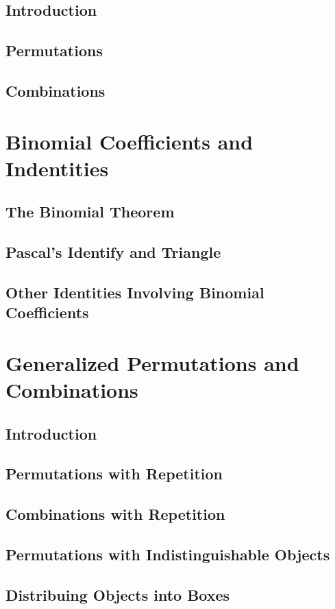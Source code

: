 \documentclass[11pt]{book}
\begin{document}
  \subsection{Introduction}
  \subsection{Permutations}
  \subsection{Combinations}
  
 \section{Binomial Coefficients and Indentities}
  \subsection{The Binomial Theorem}
  \subsection{Pascal's Identify and Triangle}
  \subsection{Other Identities Involving Binomial Coefficients}
  
 \section{Generalized Permutations and Combinations}
  \subsection{Introduction}
  \subsection{Permutations with Repetition}
  \subsection{Combinations with Repetition}
  \subsection{Permutations with Indistinguishable Objects}
  \subsection{Distribuing Objects into Boxes}
  
\end{document}
